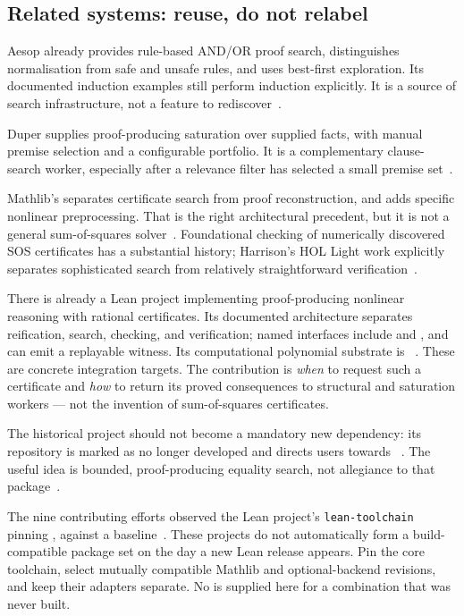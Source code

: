 \subsection{Related systems: reuse, do not relabel}

Aesop already provides rule-based AND/OR proof search, distinguishes
normalisation from safe and unsafe rules, and uses best-first exploration.
Its documented induction examples still perform induction explicitly. It is a
source of search infrastructure, not a feature to rediscover~\cite{aesop}.

Duper supplies proof-producing saturation over supplied facts, with manual
premise selection and a configurable portfolio. It is a complementary
clause-search worker, especially after a relevance filter has selected a small
premise set~\cite{duper}.

Mathlib's  separates certificate search from proof
reconstruction, and  adds specific nonlinear preprocessing.
That is the right architectural precedent, but it is not a general
sum-of-squares solver~\cite{mathlib-linarith}. Foundational checking of
numerically discovered SOS certificates has a substantial history; Harrison's
HOL Light work explicitly separates sophisticated search from relatively
straightforward verification~\cite{harrison-sos}.

There is already a Lean  project implementing proof-producing
nonlinear reasoning with rational certificates. Its documented architecture
separates reification, search, checking, and verification; named interfaces
include  and , and
 can emit a replayable witness. Its computational polynomial
substrate is ~\cite{lean-sos,sos-engine,sos-core,hex-mv-poly}.
These are concrete integration targets. The \forge{} contribution is
\emph{when} to request such a certificate and \emph{how} to return its proved
consequences to structural and saturation workers --- not the invention of
sum-of-squares certificates.

The historical  project should not become a mandatory new
dependency: its repository is marked as no longer developed and directs users
towards \grind{}~\cite{lean-egg}. The useful idea is bounded, proof-producing
equality search, not allegiance to that
package~\cite{egg,egg-lean-paper,eqsat-paper}.

\begin{remark}
The nine contributing efforts observed the Lean  project's
\texttt{lean-toolchain} pinning , against a 
baseline~\cite{sos-toolchain}. These projects do not automatically form a
build-compatible package set on the day a new Lean release appears. Pin the
core toolchain, select mutually compatible Mathlib and optional-backend
revisions, and keep their adapters separate. No  is
supplied here for a combination that was never built.
\end{remark}

